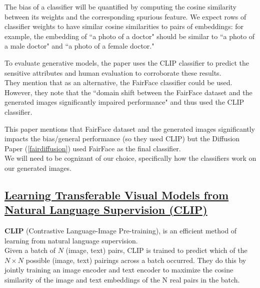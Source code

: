 \documentclass[12pt]{amsart}
\begin{document}
The bias of a classifier will be quantified by computing the cosine similarity between its weights and the corresponding spurious feature. We expect rows of classifier weights to have similar cosine similarities to pairs of embeddings: for example, the embedding of ``a photo of a doctor" should be similar to ``a photo of a male doctor" and ``a photo of a female doctor."

\begin{approach*}
To evaluate generative models, the paper uses the CLIP classifier to predict the sensitive attributes and human evaluation to corroborate these results. \\

They mention that as an alternative, the FairFace classifier could be used. However, they note that the ``domain shift between the FairFace dataset and the generated images significantly impaired performance" and thus used the CLIP classifier.
\end{approach*}

\begin{discussion*}
This paper mentions that FairFace dataset and the generated images significantly impacts the bias/general performance (so they used CLIP) but the Diffusion Paper (\ref{fairdiffusion}) used FairFace as the final classifier. \\ 

We will need to be cognizant of our choice, specifically how the classifiers work on our generated images.
\end{discussion*}

\newpage

\subsection{\href{https://arxiv.org/pdf/2103.00020.pdf}{Learning Transferable Visual Models from Natural Language Supervision (CLIP)}}

\begin{approach*} \textbf{CLIP} (Contrastive Language-Image Pre-training), is an efficient method of learning from natural language supervision. \\

Given a batch of $N$ (image, text) pairs, CLIP is trained to predict which of the $N \times N$ possible (image, text) pairings across a batch occurred. They do this by jointly training an image encoder and text encoder to maximize the cosine similarity of the image and text embeddings of the N real pairs in the batch.
\end{approach*}
\end{document}
